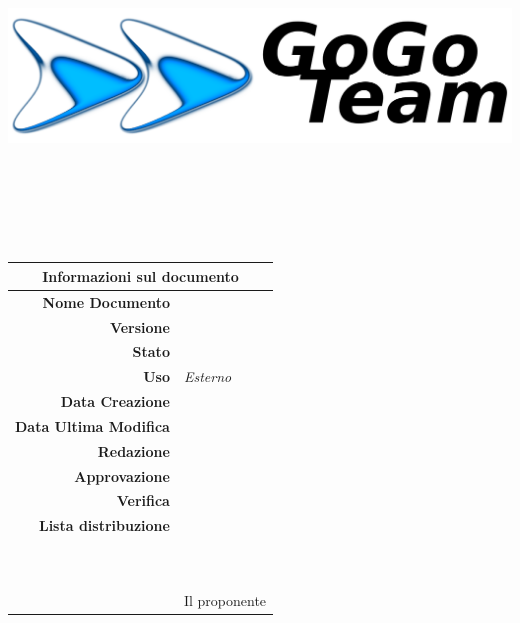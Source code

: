\thispagestyle{empty}

\begin{titlepage}

\begin{center}
	\dataUM \\
	\vspace{1cm}
	\begin{Huge}
		\textbf{\ggt}
	\end{Huge}
	
	\vspace{2cm}
	
	\includegraphics[scale=0.75]{../imgs/gogoTeamLogo.png}
	
	\vspace{2cm}
	
\HRule \\[0.4cm]
	\begin{Huge}
		{\huge \bfseries \titoloDocumento}\\[0.4cm]
	\end{Huge}
\HRule \\[2.5cm]
	
	\vfill

\begin{table}[h]
\begin{center}
\begin{tabular}{r | l}
\multicolumn{2}{c}{\textbf{Informazioni sul documento}}\\
\midrule
\textbf{Nome Documento}	&	\titoloDocumento	\\
\textbf{Versione}	&	\versione	\\
\textbf{Stato}	&	\emph{\stato}	\\
\textbf{Uso}	&	\emph{Esterno}	\\
\textbf{Data Creazione}	&	\dataCreazione	\\
\textbf{Data Ultima Modifica}	&	\dataUM	\\
\textbf{Redazione}	&	\DC	\\
\textbf{Approvazione}	&	\MB\\
\textbf{Verifica}	&	\EZ\\
\textbf{Lista distribuzione}	&	\ggt 	\\
\ 	&	\Vardanega	\\
\ 	&	\Cardin	\\
\ 	&	Il proponente \Zucchetti	\\

\end{tabular}
\end{center}
\end{table}

\end{center}

\end{titlepage}
